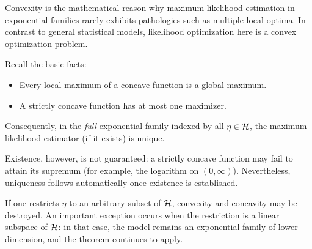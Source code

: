 Convexity is the mathematical reason why maximum likelihood estimation in exponential
families rarely exhibits pathologies such as multiple local optima.
In contrast to general statistical models, likelihood optimization here is a convex
optimization problem.

Recall the basic facts:
\begin{itemize}
    \item Every local maximum of a concave function is a global maximum.
    \item A strictly concave function has at most one maximizer.
\end{itemize}
Consequently, in the \emph{full} exponential family indexed by all
\(\eta \in \mathcal{H}\), the maximum likelihood estimator (if it exists) is unique.

Existence, however, is not guaranteed: a strictly concave function may fail to attain its
supremum (for example, the logarithm on \((0,\infty)\)).
Nevertheless, uniqueness follows automatically once existence is established.

If one restricts \(\eta\) to an arbitrary subset of \(\mathcal{H}\), convexity and concavity
may be destroyed.
An important exception occurs when the restriction is a linear subspace of \(\mathcal{H}\):
in that case, the model remains an exponential family of lower dimension, and the theorem
continues to apply.

